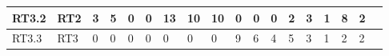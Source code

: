 \begin{table}
{\begin{tabular}{|l|l|l|l|l|l|l|l|l|l|l|l|l|l|l|l|l|l|}
RT3.2 & RT2        & 3                                                     & 5                                                                                                 & 0                                                                                                     & 0                                                       & 13                                                                                                               & 10                                                                                                          & 10                                                  & 0                                                                                                              & 0                                                                                                         & 0                                                                                                                       & 2                                                        & 3                                                                                                                              & 1                                       & 8                                                                                                               & 2                                                                                                                                              &                                                                                                                  \\ \hline
RT3.3 & RT3        & 0                                                     & 0                                                                                                 & 0                                                                                                     & 0                                                       & 0                                                                                                                & 0                                                                                                           & 0                                                   & 9                                                                                                              & 6                                                                                                         & 4                                                                                                                       & 5                                                        & 3                                                                                                                              & 1                                       & 2                                                                                                               & 2                                                                                                                                              &                                                                                                                  \\ \hline

\end{tabular}}
\end{table}
